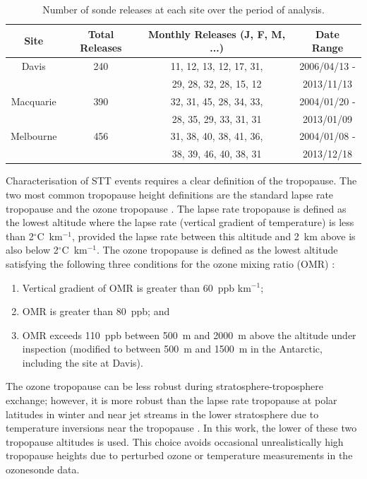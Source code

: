     \begin{table}[t]
      \caption{Number of sonde releases at each site over the period of analysis.}
      \begin{tabular}{ c   c   c   c  } 
	\hline
	Site & Total Releases & Monthly Releases (J, F, M, ...) & Date Range \\
	\hline
	Davis     & 240 & 11, 12, 13, 12, 17, 31,	& 2006/04/13 -  \\ 
		  &	& 29, 28, 32, 28, 15, 12 	& 2013/11/13	\\
	Macquarie & 390 & 32, 31, 45, 28, 34, 33,	& 2004/01/20 -  \\
		  &	& 28, 35, 29, 33, 31, 31 	& 2013/01/09	\\ 
	Melbourne & 456 & 31, 38, 40, 38, 41, 36,	& 2004/01/08 -  \\
		  &	& 38, 39, 46, 40, 38, 31        & 2013/12/18	\\
	\hline
      \end{tabular}
      \label{table:sondesummary}
    \end{table}
    
    Characterisation of STT events requires a clear definition of the tropopause.
    The two most common tropopause height definitions are the standard lapse rate tropopause \citep{WMO1957} and the ozone tropopause \citep{Bethan1996}.
    The lapse rate tropopause is defined as the lowest altitude where the lapse rate (vertical gradient of temperature) is less than 2$^\circ$C~km$^{-1}$, provided the lapse rate between this altitude and 2~km above is also below 2$^\circ$C~km$^{-1}$.
    The ozone tropopause is defined as the lowest altitude satisfying the following three conditions for the ozone mixing ratio (OMR) \citep{Bethan1996}:
    \begin{enumerate}
      \item Vertical gradient of OMR is greater than 60~ppb km$^{-1}$;
      \item OMR is greater than 80~ppb; and
      \item OMR exceeds 110~ppb between 500~m and 2000~m above the altitude under inspection (modified to between 500~m and 1500~m in the Antarctic, including the site at Davis).
    \end{enumerate}
    The ozone tropopause can be less robust during stratosphere-troposphere exchange; however, it is more robust than the lapse rate tropopause at polar latitudes in winter and near jet streams in the lower stratosphere due to temperature inversions near the tropopause \citep{Bethan1996, Tomikawa2009, Alexander2013}.
    In this work, the lower of these two tropopause altitudes is used. 
    This choice avoids occasional unrealistically high tropopause heights due to perturbed ozone or temperature measurements in the ozonesonde data.
    
